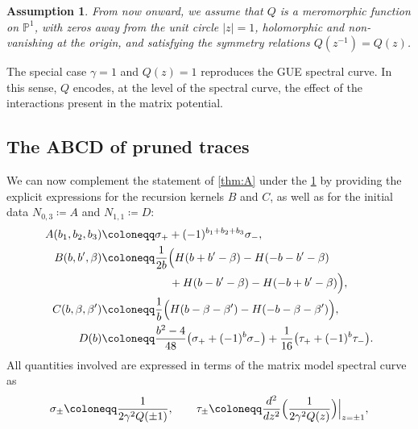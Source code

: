\documentclass[a4paper,11pt,english]{article}
\theoremstyle{plain}
\newtheorem{assumption}[theorem]{Assumption}
\theoremstyle{definition}
\theoremstyle{plain}
\renewcommand{\P}{\mathbb{P}}
\begin{document}
\begin{assumption}\label{assumpt}
    From now onward, we assume that $Q$ is a meromorphic function on $\P^1$, with zeros away from the unit circle $|z| = 1$, holomorphic and non-vanishing at the origin, and satisfying the symmetry relations $Q(z^{-1}) = Q(z)$.
\end{assumption}

The special case $\gamma = 1$ and $Q(z) = 1$ reproduces the GUE spectral curve.  
In this sense, $Q$ encodes, at the level of the spectral curve, the effect of the interactions present in the matrix potential.

\subsection{The ABCD of pruned traces}
\label{subsec:ABCD}
We can now complement the statement of \cref{thm:A} under the \cref{assumpt} by providing the explicit expressions for the recursion kernels $B$ and $C$, as well as for the initial data $N_{0,3} \coloneqq A$ and $N_{1,1} \coloneqq D$:
\begin{equation}\label{eq:ABCD}
    \begin{aligned}
    	A(b_1,b_2,b_3)
    	& \coloneqq
        \sigma_+
        +
        (-1)^{b_1+b_2+b_3} \sigma_- , \\
    	B(b,b',\beta)
    	& \coloneqq
    	\frac{1}{2b} \Bigl(
    		H(b + b' - \beta)
    		-
    		H(-b - b' - \beta) \\
    		& \qquad\qquad\qquad
    		+
    		H(b - b' - \beta)
    		-
    		H(-b + b' - \beta)
    	\Bigr) , \\
    	C(b,\beta,\beta')
    	& \coloneqq
    	\frac{1}{b} \Bigl(
    		H(b - \beta - \beta')
    		-
    		H(-b - \beta - \beta')
    	\Bigr) , \\
    	D(b)
    	& \coloneqq
        \frac{b^2 - 4}{48} \bigl( \sigma_+ + (-1)^b \sigma_- \bigr)
        +
        \frac{1}{16} \bigl( \tau_+ + (-1)^b \tau_- \bigr).
    \end{aligned}
\end{equation}
All quantities involved are expressed in terms of the matrix model spectral curve  as
\begin{equation}\label{eq:cnstnts}
    \sigma_{\pm} \coloneqq \frac{1}{2 \gamma^2 Q(\pm 1)},
    \qquad
    \tau_{\pm} \coloneqq \frac{d^2}{dz^2} \Bigl( \frac{1}{2 \gamma^2 Q(z)} \Bigr)\Big|_{z=\pm 1},
\end{equation}
\end{document}
